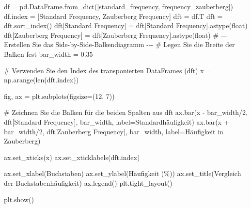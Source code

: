 \documentclass[
  nswissgerman,
  a4paper,
  DIV=11,
  numbers=noendperiod,
  ngerman]{scrreprt}
\newenvironment{Shaded}{\begin{snugshade}}{\end{snugshade}}
\newcommand{\BuiltInTok}[1]{\textcolor[rgb]{0.00,0.23,0.31}{#1}}
\newcommand{\CommentTok}[1]{\textcolor[rgb]{0.37,0.37,0.37}{#1}}
\newcommand{\DecValTok}[1]{\textcolor[rgb]{0.68,0.00,0.00}{#1}}
\newcommand{\FloatTok}[1]{\textcolor[rgb]{0.68,0.00,0.00}{#1}}
\newcommand{\NormalTok}[1]{\textcolor[rgb]{0.00,0.23,0.31}{#1}}
\newcommand{\OperatorTok}[1]{\textcolor[rgb]{0.37,0.37,0.37}{#1}}
\newcommand{\StringTok}[1]{\textcolor[rgb]{0.13,0.47,0.30}{#1}}
\begin{document}
\begin{Shaded}
\begin{Highlighting}[numbers=left,,]
\NormalTok{df }\OperatorTok{=}\NormalTok{ pd.DataFrame.from\_dict([standard\_frequency, frequency\_zauberberg])}
\NormalTok{df.index }\OperatorTok{=}\NormalTok{ [}\StringTok{\textquotesingle{}Standard Frequency\textquotesingle{}}\NormalTok{, }\StringTok{\textquotesingle{}Zauberberg Frequency\textquotesingle{}}\NormalTok{]}
\NormalTok{dft }\OperatorTok{=}\NormalTok{ df.T}
\NormalTok{dft }\OperatorTok{=}\NormalTok{ dft.sort\_index()}
\NormalTok{dft[}\StringTok{\textquotesingle{}Standard Frequency\textquotesingle{}}\NormalTok{] }\OperatorTok{=}\NormalTok{ dft[}\StringTok{\textquotesingle{}Standard Frequency\textquotesingle{}}\NormalTok{].astype(}\BuiltInTok{float}\NormalTok{)}
\NormalTok{dft[}\StringTok{\textquotesingle{}Zauberberg Frequency\textquotesingle{}}\NormalTok{] }\OperatorTok{=}\NormalTok{ dft[}\StringTok{\textquotesingle{}Zauberberg Frequency\textquotesingle{}}\NormalTok{].astype(}\BuiltInTok{float}\NormalTok{)}
\CommentTok{\# {-}{-}{-} Erstellen Sie das Side{-}by{-}Side{-}Balkendiagramm {-}{-}{-}}
\CommentTok{\# Legen Sie die Breite der Balken fest}
\NormalTok{bar\_width }\OperatorTok{=} \FloatTok{0.35}

\CommentTok{\# Verwenden Sie den Index des transponierten DataFrames (dft)}
\NormalTok{x }\OperatorTok{=}\NormalTok{ np.arange(}\BuiltInTok{len}\NormalTok{(dft.index))}

\NormalTok{fig, ax }\OperatorTok{=}\NormalTok{ plt.subplots(figsize}\OperatorTok{=}\NormalTok{(}\DecValTok{12}\NormalTok{, }\DecValTok{7}\NormalTok{))}

\CommentTok{\# Zeichnen Sie die Balken für die beiden Spalten aus dft}
\NormalTok{ax.bar(x }\OperatorTok{{-}}\NormalTok{ bar\_width}\OperatorTok{/}\DecValTok{2}\NormalTok{, dft[}\StringTok{\textquotesingle{}Standard Frequency\textquotesingle{}}\NormalTok{], bar\_width, label}\OperatorTok{=}\StringTok{\textquotesingle{}Standardhäufigkeit\textquotesingle{}}\NormalTok{)}
\NormalTok{ax.bar(x }\OperatorTok{+}\NormalTok{ bar\_width}\OperatorTok{/}\DecValTok{2}\NormalTok{, dft[}\StringTok{\textquotesingle{}Zauberberg Frequency\textquotesingle{}}\NormalTok{], bar\_width, label}\OperatorTok{=}\StringTok{\textquotesingle{}Häufigkeit in Zauberberg\textquotesingle{}}\NormalTok{)}

\NormalTok{ax.set\_xticks(x)}
\NormalTok{ax.set\_xticklabels(dft.index)}

\NormalTok{ax.set\_xlabel(}\StringTok{\textquotesingle{}Buchstaben\textquotesingle{}}\NormalTok{)}
\NormalTok{ax.set\_ylabel(}\StringTok{\textquotesingle{}Häufigkeit (\%)\textquotesingle{}}\NormalTok{)}
\NormalTok{ax.set\_title(}\StringTok{\textquotesingle{}Vergleich der Buchstabenhäufigkeit\textquotesingle{}}\NormalTok{)}
\NormalTok{ax.legend()}
\NormalTok{plt.tight\_layout()}

\NormalTok{plt.show()}
\end{Highlighting}
\end{Shaded}
\end{document}
